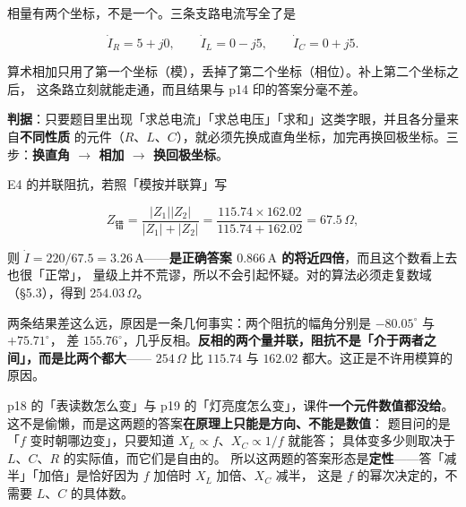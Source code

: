 \documentclass[11pt]{ctexart}
\begin{document}

相量有两个坐标，不是一个。三条支路电流写全了是

\[ \dot I_R=5+j0 ,\qquad \dot I_L=0-j5 ,\qquad \dot I_C=0+j5 . \]

算术相加只用了第一个坐标（模），丢掉了第二个坐标（相位）。补上第二个坐标之后，
这条路立刻就能走通，而且结果与 p14 印的答案分毫不差。

\textbf{判据}：只要题目里出现「求总电流」「求总电压」「求和」这类字眼，并且各分量来自\textbf{不同性质}
的元件（$R$、$L$、$C$），就必须先换成直角坐标，加完再换回极坐标。三步：\textbf{换直角 $\to$ 相加 $\to$ 换回极坐标}。


E4 的并联阻抗，若照「模按并联算」写

\[ Z_{\text{错}}=\frac{|Z_1||Z_2|}{|Z_1|+|Z_2|}=\frac{115.74\times162.02}{115.74+162.02}=67.5\,\Omega , \]

则 $\dot I=220/67.5=3.26\,\mathrm{A}$——\textbf{是正确答案 $0.866\,\mathrm{A}$ 的将近四倍}，而且这个数看上去也很「正常」，
量级上并不荒谬，所以不会引起怀疑。对的算法必须走复数域（§5.3），得到 $254.03\,\Omega$。

两条结果差这么远，原因是一条几何事实：两个阻抗的幅角分别是 $-80.05^\circ$ 与 $+75.71^\circ$，
差 $155.76^\circ$，几乎反相。\textbf{反相的两个量并联，阻抗不是「介于两者之间」，而是比两个都大}——
$254\,\Omega$ 比 $115.74$ 与 $162.02$ 都大。这正是不许用模算的原因。


p18 的「表读数怎么变」与 p19 的「灯亮度怎么变」，课件\textbf{一个元件数值都没给}。
这不是偷懒，而是这两题的答案\textbf{在原理上只能是方向、不能是数值}：
题目问的是「$f$ 变时朝哪边变」，只要知道 $X_L\propto f$、$X_C\propto1/f$ 就能答；
具体变多少则取决于 $L$、$C$、$R$ 的实际值，而它们是自由的。
所以这两题的答案形态是\textbf{定性}——答「减半」「加倍」是恰好因为 $f$ 加倍时 $X_L$ 加倍、$X_C$ 减半，
这是 $f$ 的幂次决定的，不需要 $L$、$C$ 的具体数。


\end{document}
